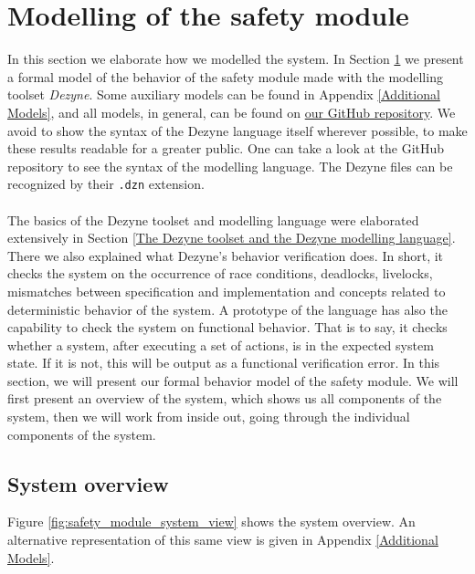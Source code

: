 \documentclass[12pt]{scrreprt}
\begin{document}
\newpage
\section{Modelling of the safety module}
\label{Formal model of the behavior of the system}
In this section we elaborate how we modelled the system. In Section \ref{Formal model of the behavior of the system} we present a formal model of the behavior of the safety module made with the modelling toolset \textit{Dezyne}. Some auxiliary models can be found in Appendix \ref{Additional Models}, and all models, in general, can be found on \href{https://github.com/Yousousen/safety-module-for-care-robot-rose.git}{our GitHub repository}. We avoid to show the syntax of the Dezyne language itself wherever possible, to make these results readable for a greater public. One can take a look at the GitHub repository to see the syntax of the modelling language. The Dezyne files can be recognized by their \texttt{.dzn} extension.
\\\\
The basics of the Dezyne toolset and modelling language were elaborated extensively in Section \ref{The Dezyne toolset and the Dezyne modelling language}. There we also explained what Dezyne's behavior verification does. In short, it checks the system on the occurrence of race conditions, deadlocks, livelocks, mismatches between specification and implementation and concepts related to deterministic behavior of the system. A prototype of the language has also the capability to check the system on functional behavior. That is to say, it checks whether a system, after executing a set of actions, is in the expected system state. If it is not, this will be output as a functional verification error. In this section, we will present our formal behavior model of the safety module. We will first present an overview of the system, which shows us all components of the system, then we will work from inside out, going through the individual components of the system.
\subsection{System overview}
\label{System overview}
Figure \ref{fig:safety_module_system_view} shows the system overview. An alternative representation of this same view is given in Appendix \ref{Additional Models}.
\end{document}
